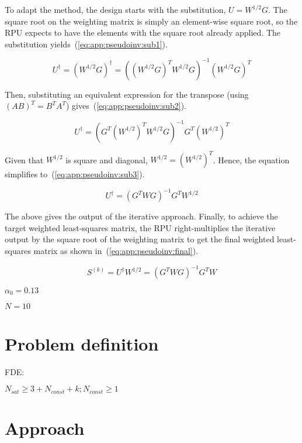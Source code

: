 \documentclass[11pt]{article}
\begin{document}
To adapt the method, the design starts with the substitution, $U = W^{1/2}G$. The square root on the weighting matrix is simply an element-wise square root, so the RPU expects to have the elements with the square root already applied. The substitution yields~(\ref{eq:app:pseudoinv:sub1}).

\begin{equation}
    \label{eq:app:pseudoinv:sub1}
    U^{\dagger} = (W^{1/2}G)^{\dagger} = ((W^{1/2}G)^T W^{1/2}G)^{-1} (W^{1/2}G)^T
\end{equation}

Then, substituting an equivalent expression for the transpose (using $(AB)^T = B^T A^T$) gives~(\ref{eq:app:pseudoinv:sub2}).

\begin{equation}
    \label{eq:app:pseudoinv:sub2}
    U^{\dagger} = (G^T (W^{1/2})^T W^{1/2}G)^{-1} G^T (W^{1/2})^T
\end{equation}

Given that $W^{1/2}$ is square and diagonal, $W^{1/2} = (W^{1/2})^T$. Hence, the equation simplifies to~(\ref{eq:app:pseudoinv:sub3}).

\begin{equation}
    \label{eq:app:pseudoinv:sub3}
    U^{\dagger} = (G^T W G)^{-1} G^T W^{1/2}
\end{equation}

The above gives the output of the iterative approach. Finally, to achieve the target weighted least-squares matrix, the RPU right-multiplies the iterative output by the square root of the weighting matrix to get the final weighted least-squares matrix as shown in~(\ref{eq:app:pseudoinv:final}).

\begin{equation}
    \label{eq:app:pseudoinv:final}
    S^{(k)} = U^{\dagger} W^{1/2} = (G^T W G)^{-1} G^T W
\end{equation}

$\alpha_0 = 0.13$

$N = 10$

\section{Problem definition}

FDE:

$N_{sat} \ge 3 + N_{const} + k; N_{const} \ge 1$

\section{Approach}
\end{document}
